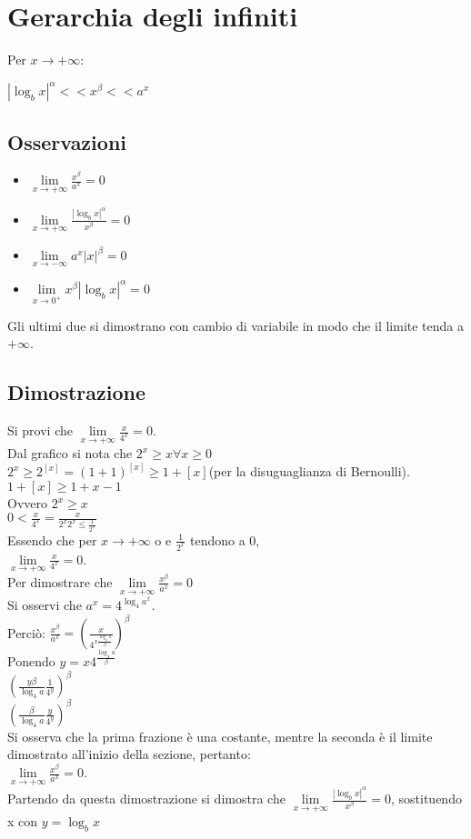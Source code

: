 \chapter{Gerarchia degli infiniti}
Per $x\rightarrow+\infty$: \\
\begin{center}
$|\log_b x|^\alpha<<x^\beta<<a^x$
\end{center}
\section{Osservazioni}
\begin{itemize}
\item $\lim\limits_{x\rightarrow+\infty}\frac{x^\beta}{a^x}=0$
\item $\lim\limits_{x\rightarrow+\infty} \frac{|\log_b x|^\alpha}{x^\beta}=0$
\item $\lim\limits_{x\rightarrow-\infty} a^x|x|^\beta=0$
\item $\lim\limits_{x\rightarrow 0^+} x^\beta|\log_b x|^\alpha=0$
\end{itemize}
Gli ultimi due si dimostrano con cambio di variabile in modo che il limite tenda a $+\infty$.
\section{Dimostrazione}
Si provi che $\lim\limits_{x\rightarrow+\infty}\frac{x}{4^x}=0$.\\
Dal grafico si nota che $2^x\ge x\forall x\ge 0$\\
$2^x\ge 2^{[x]}=(1+1)^{[x]}\ge 1+[x]$(per la disuguaglianza di Bernoulli).\\
$1+[x]\ge 1+x-1$\\
Ovvero $2^x\ge x$\\
$0<\frac{x}{4^x}=\frac{x}{2^x2^x\le \frac{1}{2^x}}$\\
Essendo che per $x\rightarrow +\infty$ o e $\frac{1}{2^x}$ tendono a 0,\\
$\lim\limits_{x\rightarrow+\infty}\frac{x}{4^x}=0$.\\
Per dimostrare che $\lim\limits_{x\rightarrow+\infty}\frac{x^\beta}{a^x}=0$\\
Si osservi che $a^x=4^{\log_4 a^x}$.\\
Perci\`o: $\frac{x^\beta}{a^x}=(\frac{x}{4^{x\frac{\log_4 a}{\beta}}})^\beta$\\
Ponendo $y=x4^{\frac{\log_4 a}{\beta}}$\\
$(\frac{y\beta}{\log_4 a}\frac{1}{4^y})^\beta$\\
$(\frac{\beta}{\log_4 a}\frac{y}{4^y})^\beta$\\
Si osserva che la prima frazione \`e una costante, mentre la seconda \`e il limite dimostrato all'inizio della sezione, pertanto:\\
$\lim\limits_{x\rightarrow+\infty}\frac{x^\beta}{a^x}=0$.\\
Partendo da questa dimostrazione si dimostra che $\lim\limits_{x\rightarrow+\infty} \frac{|\log_b x|^\alpha}{x^\beta}=0$, sostituendo x con $y=\log_b x$
